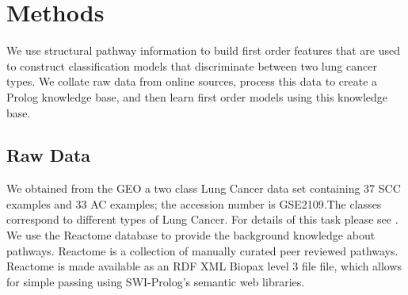 \documentclass[runningheads,a4paper]{llncs}
\begin{document}
%





 
%

	  
\section{Methods}
 We use structural pathway information to build first order features that are used to construct classification models that discriminate between two lung cancer types.
 We collate raw data from online sources, process this data to create a
 Prolog knowledge base, and then learn first order models using this knowledge base. 

\subsection{Raw Data} 
We obtained from the GEO a two class Lung Cancer data set containing 37 SCC examples and 33 AC examples; the accession number is GSE2109.The classes correspond to different types of Lung Cancer. For details of this task please see \citep{rhrissorrakrai_sbv_2013}.  
We use the Reactome database to provide the background knowledge about pathways. Reactome \citep{croft_reactome_2013} is a collection of manually curated peer reviewed pathways. Reactome is made available as an RDF XML Biopax level 3 file file, which allows for simple passing using SWI-Prolog's semantic web libraries. 
\end{document}
